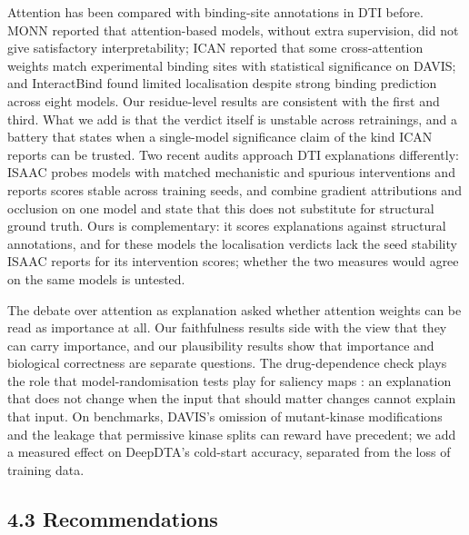 Attention has been compared with binding-site annotations in DTI before. MONN \citep{Li2020} reported that attention-based models, without extra supervision, did not give satisfactory interpretability; ICAN \citep{Kurata2022} reported that some cross-attention weights match experimental binding sites with statistical significance on DAVIS; and InteractBind \citep[][preprint]{Meng2026} found limited localisation despite strong binding prediction across eight models. Our residue-level results are consistent with the first and third. What we add is that the verdict itself is unstable across retrainings, and a battery that states when a single-model significance claim of the kind ICAN reports can be trusted. Two recent audits approach DTI explanations differently: ISAAC \citep[][preprint]{Tarantino2026} probes models with matched mechanistic and spurious interventions and reports scores stable across training seeds, and \citet[][preprint]{Vefghi2026} combine gradient attributions and occlusion on one model and state that this does not substitute for structural ground truth. Ours is complementary: it scores explanations against structural annotations, and for these models the localisation verdicts lack the seed stability ISAAC reports for its intervention scores; whether the two measures would agree on the same models is untested.

The debate over attention as explanation \citep{Jain2019,Wiegreffe2019} asked whether attention weights can be read as importance at all. Our faithfulness results side with the view that they can carry importance, and our plausibility results show that importance and biological correctness are separate questions. The drug-dependence check plays the role that model-randomisation tests play for saliency maps \citep{Adebayo2018}: an explanation that does not change when the input that should matter changes cannot explain that input. On benchmarks, DAVIS's omission of mutant-kinase modifications \citep[][preprint]{Wu2025} and the leakage that permissive kinase splits can reward \citep[][preprint]{Ong2023} have precedent; we add a measured effect on DeepDTA's cold-start accuracy, separated from the loss of training data.

\subsection{4.3 Recommendations}\label{recommendations}


